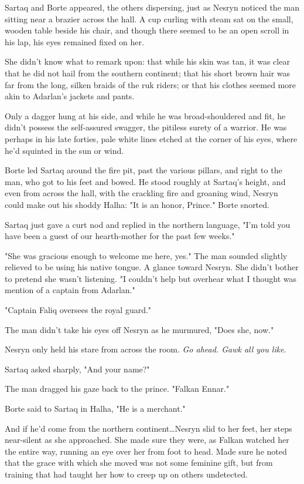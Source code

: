 Sartaq and Borte appeared, the others dispersing, just as Nesryn noticed the man sitting near a brazier across the hall.
A cup curling with steam sat on the small, wooden table beside his chair, and though there seemed to be an open scroll in his lap, his eyes remained fixed on her.

She didn't know what to remark upon: that while his skin was tan, it was clear that he did not hail from the southern continent; that his short brown hair was far from the long, silken braids of the ruk riders; or that his clothes seemed more akin to Adarlan's jackets and pants.

Only a dagger hung at his side, and while he was broad-shouldered and fit, he didn't possess the self-assured swagger, the pitiless surety of a warrior.
He was perhaps in his late forties, pale white lines etched at the corner of his eyes, where he'd squinted in the sun or wind.

Borte led Sartaq around the fire pit, past the various pillars, and right to the man, who got to his feet and bowed.
He stood roughly at Sartaq's height, and even from across the hall, with the crackling fire and groaning wind, Nesryn could make out his shoddy Halha: "It is an honor, Prince."
Borte snorted.

Sartaq just gave a curt nod and replied in the northern language, "I'm told you have been a guest of our hearth-mother for the past few weeks."

"She was gracious enough to welcome me here, yes."
The man sounded slightly relieved to be using his native tongue.
A glance toward Nesryn.
She didn't bother to pretend she wasn't listening.
"I couldn't help but overhear what I thought was mention of a captain from Adarlan."

"Captain Faliq oversees the royal guard."

The man didn't take his eyes off Nesryn as he murmured, "Does she, now."

Nesryn only held his stare from across the room.
\emph{Go ahead.
Gawk all you like}.

Sartaq asked sharply, "And your name?"

The man dragged his gaze back to the prince.
"Falkan Ennar."

Borte said to Sartaq in Halha, "He is a merchant."

And if he'd come from the northern continent\ldots Nesryn slid to her feet, her steps near-silent as she approached.
She made sure they were, as Falkan watched her the entire way, running an eye over her from foot to head.
Made sure he noted that the grace with which she moved was not some feminine gift, but from training that had taught her how to creep up on others undetected.


